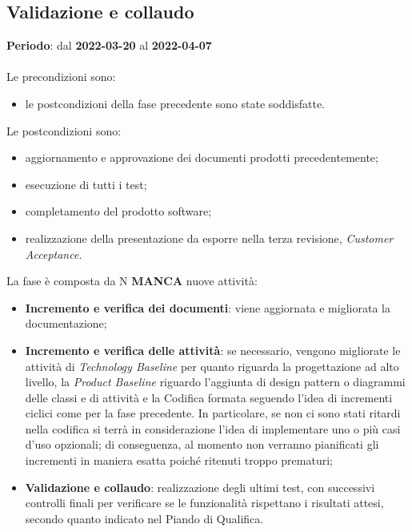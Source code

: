 \subsection{Validazione e collaudo}
\textbf{Periodo}: dal \textbf{2022-03-20} al \textbf{2022-04-07} \mbox{} \\ \mbox{} \\

Le precondizioni sono:
\begin{itemize}
	\item le postcondizioni della fase precedente sono state soddisfatte.
\end{itemize}

Le postcondizioni sono:
\begin{itemize}
	\item aggiornamento e approvazione dei documenti prodotti precedentemente;
	\item esecuzione di tutti i test;
	\item completamento del prodotto software;
	\item realizzazione della presentazione da esporre nella terza revisione, \textit{Customer Acceptance}. 
\end{itemize}

La fase è composta da N \textbf{MANCA} nuove attività:
\begin{itemize}
	\item \textbf{Incremento e verifica dei documenti}: viene aggiornata e migliorata la documentazione;
	\item \textbf{Incremento e verifica delle attività}: se necessario, vengono migliorate le attività di \textit{Technology Baseline} per quanto riguarda la progettazione ad alto livello, la \textit{Product Baseline} riguardo l’aggiunta di design pattern o diagrammi delle classi e di attività e la Codifica formata seguendo l’idea di incrementi ciclici come per la fase precedente. In particolare,  se non ci sono stati ritardi nella codifica si terrà in considerazione l’idea di implementare uno o più casi d’uso opzionali; di conseguenza,  al momento non verranno pianificati gli incrementi in maniera esatta poiché ritenuti troppo prematuri;
	\item \textbf{Validazione e collaudo}: realizzazione degli ultimi test, con successivi controlli finali per verificare se le funzionalità rispettano i risultati attesi,  secondo quanto indicato nel Piando di Qualifica.
\end{itemize}

